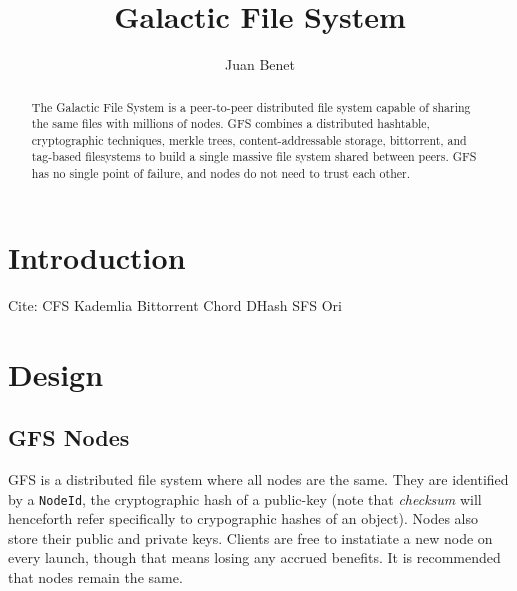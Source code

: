 \documentclass{sig-alternate}
\begin{document}

\title{Galactic File System}
\subtitle{}


\author{
%
%
\alignauthor
  Juan Benet\\
}

\maketitle
\begin{abstract}
The Galactic File System is a peer-to-peer distributed file system capable of
sharing the same files with millions of nodes. GFS combines a distributed
hashtable, cryptographic techniques, merkle trees, content-addressable
storage, bittorrent, and tag-based filesystems to build a single massive
file system shared between peers. GFS has no single point of failure, and
nodes do not need to trust each other.
\end{abstract}

\section{Introduction}

Cite:
CFS
Kademlia
Bittorrent
Chord
DHash
SFS
Ori

\section{Design}

\subsection{GFS Nodes}

GFS is a distributed file system where all nodes are the same. They are
identified by a \texttt{NodeId}, the cryptographic hash of a public-key
(note that \textit{checksum} will henceforth refer specifically to crypographic
hashes of an object). Nodes also store their public and private keys. Clients
are free to instatiate a new node on every launch, though that means losing any
accrued benefits. It is recommended that nodes remain the same.
\end{document}
